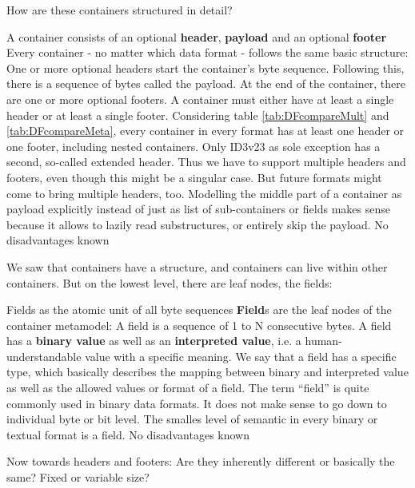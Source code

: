 How are these containers structured in detail?

{%
A container consists of an optional \textbf{header}, \textbf{payload} and an optional \textbf{footer}
}
{%
Every container - no matter which data format - follows the same basic structure: One or more optional headers start the container's byte sequence. Following this, there is a sequence of bytes called the payload. At the end of the container, there are one or more optional footers. A container must either have at least a single header or at least a single footer.
}
{%
Considering table \ref{tab:DFcompareMult} and \ref{tab:DFcompareMeta}, every container in every format has at least one header or one footer, including nested containers. Only ID3v23 as sole exception has a second, so-called extended header. Thus we have to support multiple headers and footers, even though this might be a singular case. But future formats might come to bring multiple headers, too. Modelling the middle part of a container as payload explicitly instead of just as list of sub-containers or fields makes sense because it allows to lazily read substructures, or entirely skip the payload.
}
{%
No disadvantages known
}

We saw that containers have a structure, and containers can live within other containers. But on the lowest level, there are leaf nodes, the fields:

{%
Fields as the atomic unit of all byte sequences
}
{%
\textbf{Field}s are the leaf nodes of the container metamodel: A field is a sequence of 1 to N consecutive bytes. A field has a \textbf{binary value} as well as an \textbf{interpreted value}, i.e. a human-understandable value with a specific meaning. We say that a field has a specific type, which basically describes the mapping between binary and interpreted value as well as the allowed values or format of a field.
}
{%
The term ``field'' is quite commonly used in binary data formats. It does not make sense to go down to individual byte or bit level. The smalles level of semantic in every binary or textual format is a field.
}
{%
No disadvantages known
}

Now towards headers and footers: Are they inherently different or basically the same? Fixed or variable size?

